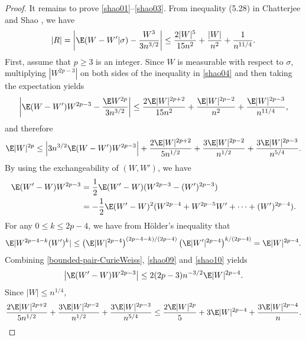 \begin{proof}
		It remains to prove \eqref{shao01}--\eqref{shao03}. 
		From inequality (5.28) in Chatterjee and Shao \cite{chatterjee2011nonnormal}, we have
		\begin{equation}\label{shao04}
			|R|=\left|\E(W-W'|\sigma)-\frac{W^3}{3n^{3/2}}\right|\le \frac{2|W|^5}{15n^{2}}+\frac{|W|}{n^2}+\frac{1}{n^{11/4}}.
		\end{equation}
		First, assume that $p\ge 3$ is an integer.
		Since $W$ is measurable with respect to $\sigma$, multiplying $|W^{2p-3}|$ on both sides
		of the inequality in \eqref{shao04} and then taking the expectation yields
		\begin{equation}\label{shao05}
			\left|\E(W-W')W^{2p-3}-\frac{\E W^{2p}}{3n^{3/2}}\right|\le \frac{2\E|W|^{2p+2}}{15n^{2}}+\frac{\E|W|^{2p-2}}{n^2}+\frac{\E|W|^{2p-3}}{n^{11/4}},
		\end{equation}
		and therefore
		\begin{equation}\label{shao07}
			\E|W|^{2p}\le 	\left|3n^{3/2}\E(W-W')W^{2p-3}\right|+\frac{2\E|W|^{2p+2}}{5n^{1/2}}+\frac{3\E|W|^{2p-2}}{n^{1/2}}+\frac{3\E|W|^{2p-3}}{n^{5/4}}.
		\end{equation}
		By using the exchangeability of $(W,W')$, we have
\begin{equation}\label{shao09}
			\begin{split}
				\E(W'-W)W^{2p-3}&=\frac{1}{2}\E(W'-W)(W^{2p-3}-(W')^{2p-3})\\
				&=-\frac{1}{2}\E(W'-W)^2(W^{2p-4}+W^{2p-5}W'+\cdots+(W')^{2p-4}).
			\end{split}
\end{equation}
		For any $0\le k\le 2p-4$, we have from H\"{o}lder's inequality that
		\begin{equation}\label{shao10}
			\begin{split}
				\E |W^{2p-4-k}(W')^{k}|\le \left(\E|W|^{2p-4}\right)^{(2p-4-k)/(2p-4)}\left(\E|W'|^{2p-4}\right)^{k/(2p-4)}=\E |W|^{2p-4}.
			\end{split}
		\end{equation} 
Combining \eqref{bounded-pair-CurieWeiss}, \eqref{shao09} and \eqref{shao10} yields
		\begin{equation}\label{shao11}
			\begin{split}
				\left|\E(W'-W)W^{2p-3}\right|\le 2(2p-3)n^{-3/2}\E|W|^{2p-4}.
			\end{split}
		\end{equation}
		Since $|W|\le n^{1/4}$,
		\begin{equation}\label{shao17}
			\frac{2\E|W|^{2p+2}}{5n^{1/2}}+\frac{3\E|W|^{2p-2}}{n^{1/2}}+\frac{3\E|W|^{2p-3}}{n^{5/4}}\le \frac{2\E|W|^{2p}}{5}+3\E|W|^{2p-4}+\frac{3\E|W|^{2p-4}}{n}.

\end{equation}
\end{proof}

